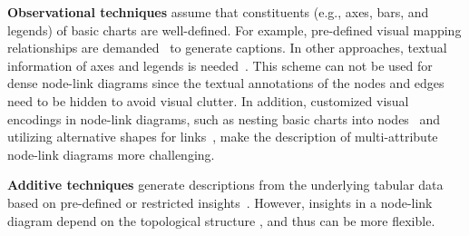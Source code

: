\textbf{Observational techniques} assume that constituents (e.g., axes, bars, and legends) of basic charts are well-defined. 
For example, 
pre-defined visual mapping relationships 
are demanded~\cite{DBLP:journals/coling/MittalMCR98} 
to generate captions.
In other approaches, textual information of axes and legends is needed~\cite{DBLP:conf/icip/ZhouT00, DBLP:conf/doceng/HuangT07, DBLP:conf/grec/HuangTL03}.
This scheme can not be used for dense node-link diagrams since the textual annotations of the nodes and edges need to be hidden to avoid visual clutter.
In addition, customized visual encodings in node-link diagrams, such as nesting basic charts into nodes~\cite{gehlenborg2010visualization, DBLP:conf/iv/JusufiDK10} and utilizing alternative shapes for links~\cite{DBLP:conf/iv/SchoffelSE16, DBLP:journals/tvcg/NielsenJBJ09}, make the description of multi-attribute node-link diagrams more challenging. 

\textbf{Additive techniques} generate descriptions from the underlying tabular data based on pre-defined or restricted insights~\cite{DBLP:journals/pvldb/DemiralpHPP17, DBLP:journals/tvcg/WangSZCXMZ20, DBLP:conf/apvis/LiuXHWY20, DBLP:conf/chi/KimHA20}. However, insights in a node-link diagram depend on the topological structure 
, and thus
can be more flexible.


